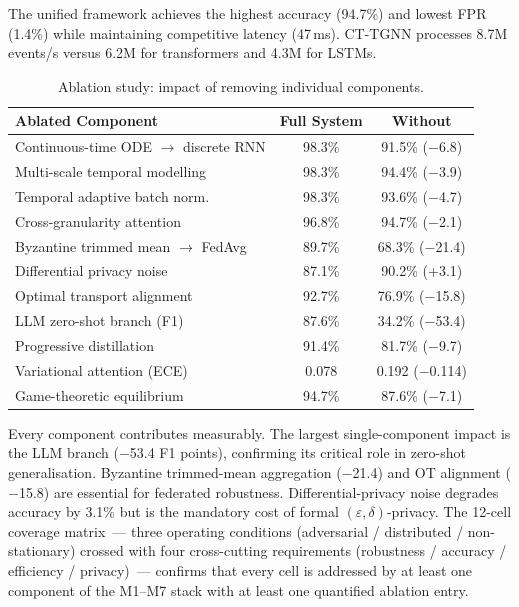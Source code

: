 The unified framework achieves the highest accuracy (94.7\%) and lowest FPR (1.4\%) while maintaining competitive latency (47\,ms). CT-TGNN processes 8.7M events/s versus 6.2M for transformers and 4.3M for LSTMs.

\label{sec:ablation}%

\begin{table}[htbp]\centering\small
\caption{Ablation study: impact of removing individual components.}
\label{tab:ablation}
\renewcommand{\arraystretch}{0.92}\begin{tabular}{lcc}
\toprule
Ablated Component & Full System & Without \\
\midrule
Continuous-time ODE $\to$ discrete RNN & 98.3\% & 91.5\% ($-$6.8) \\
Multi-scale temporal modelling         & 98.3\% & 94.4\% ($-$3.9) \\
Temporal adaptive batch norm.          & 98.3\% & 93.6\% ($-$4.7) \\
Cross-granularity attention            & 96.8\% & 94.7\% ($-$2.1) \\
Byzantine trimmed mean $\to$ FedAvg    & 89.7\% & 68.3\% ($-$21.4) \\
Differential privacy noise            & 87.1\% & 90.2\% (+3.1) \\
Optimal transport alignment            & 92.7\% & 76.9\% ($-$15.8) \\
LLM zero-shot branch (F1)             & 87.6\% & 34.2\% ($-$53.4) \\
Progressive distillation               & 91.4\% & 81.7\% ($-$9.7) \\
Variational attention (ECE)            & 0.078  & 0.192 ($-$0.114) \\
Game-theoretic equilibrium             & 94.7\% & 87.6\% ($-$7.1) \\
\bottomrule
\end{tabular}\end{table}

Every component contributes measurably. The largest single-component impact is the LLM branch ($-$53.4 F1 points), confirming its critical role in zero-shot generalisation. Byzantine trimmed-mean aggregation ($-$21.4) and OT alignment ($-$15.8) are essential for federated robustness. Differential-privacy noise degrades accuracy by 3.1\% but is the mandatory cost of formal $(\varepsilon,\delta)$-privacy. The 12-cell coverage matrix~--- three operating conditions (adversarial / distributed / non-stationary) crossed with four cross-cutting requirements (robustness / accuracy / efficiency / privacy)~--- confirms that every cell is addressed by at least one component of the M1--M7 stack with at least one quantified ablation entry.


